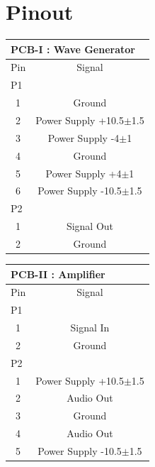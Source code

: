 \documentclass[a4paper,12pt,oneside,pdflatex,italian,final,twocolumn]{article}
\begin{document}
\section{Pinout}
\begin{minipage}{.48\textwidth}
\begin{center}
    \begin{tabular}{|c|c|}
     \multicolumn{2}{l}{\textbf{PCB-I : Wave Generator}}\\
    \toprule
        Pin & Signal \\
    \midrule
        \multicolumn{2}{|l|}{P1}\\
    \midrule
    1 & Ground \\
    2 & Power Supply +10.5$\pm$1.5\\
    3 & Power Supply -4$\pm$1\\
    4 & Ground \\
    5 & Power Supply +4$\pm$1\\
    6 & Power Supply -10.5$\pm$1.5\\
    \midrule
        \multicolumn{2}{|l|}{P2}\\
    \midrule
    1 & Signal Out\\
    2 & Ground\\
    \bottomrule
\end{tabular}
\end{center}
\end{minipage}
\begin{minipage}{.48\textwidth}
\begin{center}
    \begin{tabular}{|c|c|}
     \multicolumn{2}{l}{\textbf{PCB-II : Amplifier}}\\
    \toprule
        Pin & Signal \\ 
    \midrule
    \multicolumn{2}{|l|}{P1}\\
    \midrule
    1 & Signal In\\
    2 & Ground\\
    \midrule
    \multicolumn{2}{|l|}{P2}\\
    \midrule
    1 & Power Supply +10.5$\pm$1.5\\
    2 & Audio Out\\
    3 & Ground\\
    4 & Audio Out\\
    5 & Power Supply -10.5$\pm$1.5\\
    \bottomrule
\end{tabular}
\end{center}
\end{minipage}
\newpage
\end{document}
